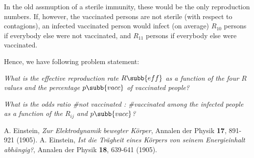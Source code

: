 \documentclass[12pt,a4paper]{scrartcl}
\begin{document}
In the
old assmuption of a sterile immunity, these would be the only
reproduction numbers. If, however, the vaccinated persons are not
sterile (with 
respect to contagions), an infected vaccinated person would infect (on
average) $R_{10}$ persons if everybody else were not vaccinated, and
$R_{11}$ persons if everybody else were vaccinated.
\newpage

Hence, we have following problem statement:
\medskip

\noindent \hspace*{0.10\textwidth}
\parbox{0.8\textwidth}{
 \benum \item \textit{What is the effective reproduction rate
    $R\subb{eff}$ as a function of the four $R$ values and the
    percentage $p\subb{vacc}$ of vaccinated people?} 
\item \textit{What is the odds
    ratio \#not vaccinated : \#vaccinated among the infected people as a
    function of the $R_{ij}$ and $p\subb{vacc}$?}
\eenum}















% 




%


\begin{thebibliography}{10}
A. Einstein, \textit{Zur Elektrodynamik bewegter K\"orper}, 
Annalen der Physik \textbf{17}, 891-921 (1905).
A. Einstein, \textit{Ist die Tr\"agheit eines K\"orpers von seinem 
Energieinhalt abh\"angig?}, Annalen der Physik \textbf{18}, 639-641 (1905).

\end{thebibliography}
\end{document}
